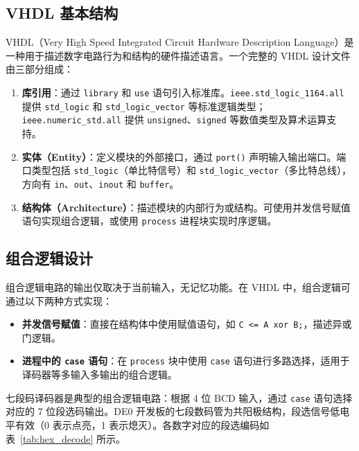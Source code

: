 \documentclass[12pt]{ctexart}
\begin{document}
\subsection{VHDL 基本结构}

VHDL（Very High Speed Integrated Circuit Hardware Description Language）是一种用于描述数字电路行为和结构的硬件描述语言。一个完整的 VHDL 设计文件由三部分组成：

\begin{enumerate}
    \item \textbf{库引用}：通过 \texttt{library} 和 \texttt{use} 语句引入标准库。\texttt{ieee.std\_logic\_1164.all} 提供 \texttt{std\_logic} 和 \texttt{std\_logic\_vector} 等标准逻辑类型；\texttt{ieee.numeric\_std.all} 提供 \texttt{unsigned}、\texttt{signed} 等数值类型及算术运算支持。
    \item \textbf{实体（Entity）}：定义模块的外部接口，通过 \texttt{port()} 声明输入输出端口。端口类型包括 \texttt{std\_logic}（单比特信号）和 \texttt{std\_logic\_vector}（多比特总线），方向有 \texttt{in}、\texttt{out}、\texttt{inout} 和 \texttt{buffer}。
    \item \textbf{结构体（Architecture）}：描述模块的内部行为或结构。可使用并发信号赋值语句实现组合逻辑，或使用 \texttt{process} 进程块实现时序逻辑。
\end{enumerate}

\subsection{组合逻辑设计}

组合逻辑电路的输出仅取决于当前输入，无记忆功能。在 VHDL 中，组合逻辑可通过以下两种方式实现：

\begin{itemize}
    \item \textbf{并发信号赋值}：直接在结构体中使用赋值语句，如 \texttt{C <= A xor B;}，描述异或门逻辑。
    \item \textbf{进程中的 \texttt{case} 语句}：在 \texttt{process} 块中使用 \texttt{case} 语句进行多路选择，适用于译码器等多输入多输出的组合逻辑。
\end{itemize}

七段码译码器是典型的组合逻辑电路：根据 4 位 BCD 输入，通过 \texttt{case} 语句选择对应的 7 位段选码输出。DE0 开发板的七段数码管为共阳极结构，段选信号低电平有效（0 表示点亮，1 表示熄灭）。各数字对应的段选编码如表~\ref{tab:hex_decode} 所示。
\end{document}
